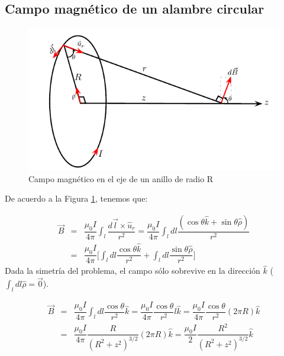 \subsection*{Campo magnético de un alambre circular}

\begin{figure}[h]
\begin{center}
\includegraphics[scale=0.8]{magnetostatica/campoB-anillo}
\end{center}
\caption{Campo magnético en el eje de un anillo de radio R}
\label{fig-campoB-anillo}
\end{figure}

De acuerdo a la Figura \ref{fig-campoB-anillo}, tenemos que:

\begin{eqnarray}
\nonumber
\vec{B}&=&\dfrac{\mu_0 I}{4\pi}\int_l \dfrac{d\vec{l}\times \hat{u}_r}{r^{2}}
=\dfrac{\mu_0 I}{4\pi}\int_l dl\dfrac{(\cos\theta \hat{k}+\sin\theta \hat{\rho})}{r^{2}} \\ \nonumber
&=&\dfrac{\mu_0 I}{4\pi}\Big[\int_l dl \dfrac{\cos\theta \hat{k}}{r^{2}}+\int_l dl \dfrac{\sin\theta \hat{\rho}}{r^{2}}\Big]
\end{eqnarray}
Dada la simetría del problema, el campo sólo sobrevive en la dirección $\hat{k}$ ($\int_l dl \hat{\rho}=\vec{0}$).

\begin{eqnarray}
\nonumber
\vec{B}&=&\dfrac{\mu_0 I}{4\pi}\int_l dl \dfrac{\cos\theta }{r^{2}}\hat{k}
=\dfrac{\mu_0 I}{4\pi} \dfrac{\cos\theta}{r^{2}} l \hat{k} 
=\dfrac{\mu_0 I}{4\pi} \dfrac{\cos\theta}{r^{2}} (2\pi R) \hat{k} \\
&=&\dfrac{\mu_0 I}{4\pi} \dfrac{R}{(R^{2}+z^{2})^{3/2}} (2\pi R) \hat{k}
=\dfrac{\mu_0 I}{2} \dfrac{R^{2}}{(R^{2}+z^{2})^{3/2}}\hat{k}
\end{eqnarray}

